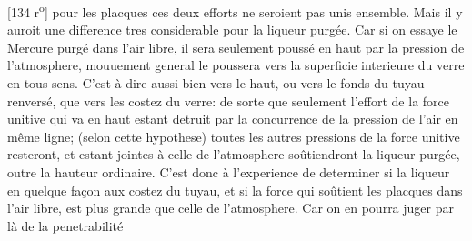 [134 r\textsuperscript{o}] pour les placques ces deux efforts ne seroient pas unis ensemble. Mais il y auroit une difference tres considerable pour la liqueur\protect{} purg\'{e}e. Car si on essaye le Mercure purg\'{e}\protect{} dans l'air libre, il sera seulement pouss\'{e} en haut par la pression de l'atmosphere\protect{},  mouuement general le poussera vers la superficie interieure du verre en tous sens. C'est \`{a} dire aussi bien vers le haut, ou vers le fonds du tuyau renvers\'{e}, que vers les costez du verre: de sorte que seulement l'effort de la force unitive qui va en haut estant detruit par la concurrence de la pression de l'air\protect{} en même ligne; (selon cette hypothese) toutes les autres pressions de la force unitive resteront, et estant jointes \`{a} celle de l'atmosphere\protect{} soûtiendront la liqueur purg\'{e}e\protect{}, outre la hauteur ordinaire. C'est donc \`{a} l'experience de determiner si la liqueur\protect{}  en quelque fa\c{c}on aux costez du tuyau, et si la force qui soûtient les placques dans l'air libre, est plus grande que celle de l'atmosphere\protect{}. Car on en pourra juger par l\`{a} de la penetrabilit\'{e} %
